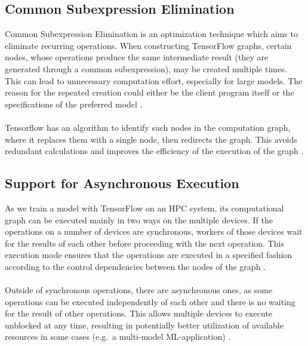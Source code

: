 \documentclass[ieeetran]{article}
\begin{document}
\subsection{Common Subexpression Elimination} %
\label{sub:common_subexpression_elimination}
Common Subexpression Elimination is an optimization technique which aims to eliminate recurring operations. When constructing TensorFlow graphs, certain nodes, whose operations produce the same intermediate result (they are generated through a common subexpression), may be created multiple times. This can lead to unnecessary computation effort, especially for large models. The reason for the repeated creation could either be the client program itself or the specifications of the preferred model \cite{first}.
\\ \\Tensorflow has an algorithm to identify such nodes in the computation graph, where it replaces them with a single node, then redirects the graph. This avoids redundant calculations and improves the efficiency of the execution of the graph \cite{first}.

\subsection{Support for Asynchronous Execution} %
\label{sub:support_for_asynchronous_kernels}
As we train a model with TensorFlow on an HPC system, its computational graph can be executed mainly in two ways on the multiple devices. If the operations on a number of devices are synchronous, workers of those devices wait for the results of each other before proceeding with the next operation. This execution mode ensures that the operations are executed in a specified fashion according to the control dependencies between the nodes of the graph \cite{first} \cite{fifth}.
\\ \\Outside of synchronous operations, there are asynchronous ones, as some operations can be executed independently of each other and there is no waiting for the result of other operations. This allows multiple devices to execute unblocked at any time, resulting in potentially better utilization of available resources in some cases (e.g.\ a multi-model ML-application) \cite{fifth}.
\end{document}
